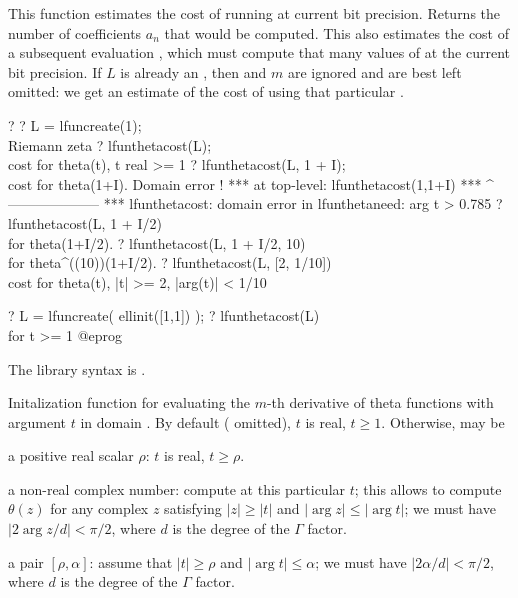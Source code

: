 \label{se:lfunthetacost}
This function estimates the cost of running
 at current bit precision. Returns the number of
coefficients $a_n$ that would be computed. This also estimates the
cost of a subsequent evaluation , which must compute
that many values of  at the current bit precision.
If $L$ is already an , then  and $m$ are ignored
and are best left omitted: we get an estimate of the cost of using that
particular .

\bprog
? 
? L = lfuncreate(1); \\ Riemann zeta
? lfunthetacost(L); \\ cost for theta(t), t real >= 1
? lfunthetacost(L, 1 + I); \\ cost for theta(1+I). Domain error !
 ***   at top-level: lfunthetacost(1,1+I)
 ***                 ^--------------------
 *** lfunthetacost: domain error in lfunthetaneed: arg t > 0.785
? lfunthetacost(L, 1 + I/2) \\ for theta(1+I/2).
? lfunthetacost(L, 1 + I/2, 10) \\ for theta^((10))(1+I/2).
? lfunthetacost(L, [2, 1/10]) \\ cost for theta(t), |t| >= 2, |arg(t)| < 1/10

? L = lfuncreate( ellinit([1,1]) );
? lfunthetacost(L)  \\ for t >= 1
@eprog

The library syntax is .

\label{se:lfunthetainit}
Initalization function for evaluating the $m$-th derivative of theta
functions with argument $t$ in domain . By default (
omitted), $t$ is real, $t \geq 1$. Otherwise,  may be

\item a positive real scalar $\rho$: $t$ is real, $t \geq \rho$.

\item a non-real complex number: compute at this particular $t$; this
allows to compute $\theta(z)$ for any complex $z$ satisfying $|z|\geq |t|$
and $|\arg z| \leq |\arg t|$; we must have $|2 \arg z / d| < \pi/2$, where
$d$ is the degree of the $\Gamma$ factor.

\item a pair $[\rho,\alpha]$: assume that $|t| \geq \rho$ and $|\arg t| \leq
\alpha$; we must have $|2\alpha / d| < \pi/2$, where $d$ is the degree of
the $\Gamma$ factor.

